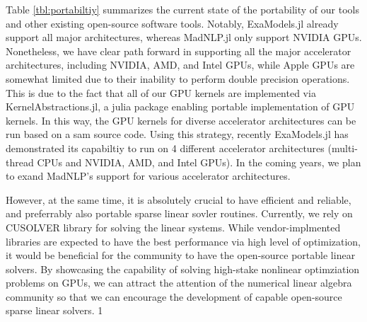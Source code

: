 \documentclass{article}
\begin{document}
Table \ref{tbl:portabiltiy} summarizes the current state of the portability of our tools and other existing open-source software tools. Notably, ExaModels.jl already support all major architectures, whereas MadNLP.jl only support NVIDIA GPUs. Nonetheless, we have clear path forward in supporting all the major accelerator architectures, including NVIDIA, AMD, and Intel GPUs, while Apple GPUs are somewhat limited due to their inability to perform double precision operations. This is due to the fact that all of our GPU kernels are implemented via KernelAbstractions.jl, a julia package enabling portable implementation of GPU kernels. In this way, the GPU kernels for diverse accelerator architectures can be run based on a sam source code. Using this strategy, recently ExaModels.jl has demonstrated its capabiltiy to run on 4 different accelerator architectures (multi-thread CPUs and NVIDIA, AMD, and Intel GPUs). In the coming years, we plan to exand MadNLP's support for various accelerator architectures.

However, at the same time, it is absolutely crucial to have efficient and reliable, and preferrably also portable sparse linear sovler routines. Currently, we rely on CUSOLVER library for solving the linear systems. While vendor-implmented libraries are expected to have the best performance via high level of optimization, it would be beneficial for the community to have the open-source portable linear solvers. By showcasing the capability of solving high-stake nonlinear optimziation problems on GPUs, we can attract the attention of the numerical linear algebra community so that we can encourage the development of capable open-source sparse linear solvers. 
1
\begin{table}[t]
  \begin{center}
  \end{center}
  \caption{The current status on the portability of the nonlinear optimization frameworks.}
  \label{tbl:portabiltiy}
\end{table}
\end{document}
